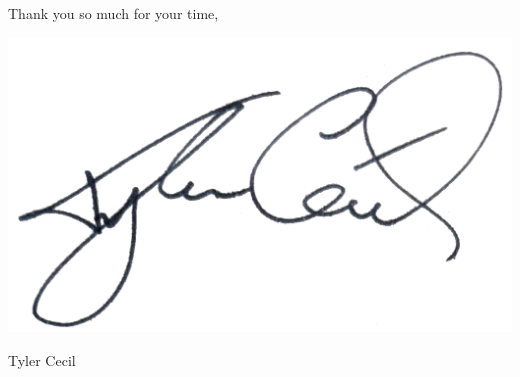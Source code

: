 \documentclass{tc_cv}
\begin{document}
\begin{adjustwidth}{38pt}{38pt}
  \begin{minipage}{0.5\linewidth}
    Thank you so much for your time,
    \vspace{1em}
  \end{minipage}
  \begin{minipage}{0.5\linewidth}
    \hfill\includegraphics[height=4.5\baselineskip]{sig}

    \vspace{-2em}
    \hfill Tyler Cecil
  \end{minipage}

\end{adjustwidth}
\end{document}
